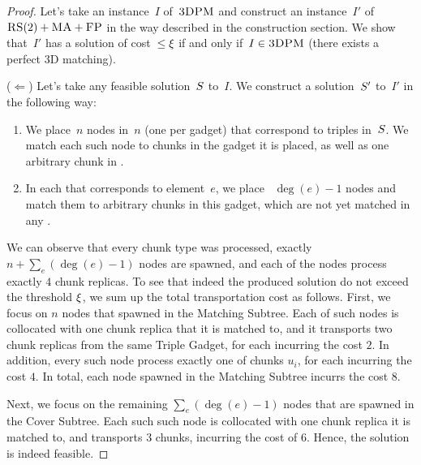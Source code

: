 \begin{proof}
  
  Let's take an instance~$I$ of~$\textsc{3DPM}$ and construct an instance~$I'$ of~$\textsc{RS}(2)+\textsc{MA}+\textsc{FP}$ in the way described in the construction section.
  We show that~$I'$ has a solution of cost~$\leq \xi$ if and only if~$I \in \textsc{3DPM}$ (there exists a perfect 3D matching).

  ($\Leftarrow$) Let's take any feasible solution~$S$ to~$I$.
  We construct a solution~$S'$ to~$I'$ in the following way:
  \begin{enumerate}
    \item We place~$n$ nodes in~$n$ {\TripleGadgets} (one per gadget)
    that correspond to triples in~$S$. We match each such node
    to chunks in the gadget it is placed, as well as one arbitrary
    chunk in {\UnqSubtree}.
    \item In each {\ElGadget} that corresponds to element~$e$, we place
   ~$\deg(e) - 1$ nodes and match them to arbitrary chunks in this
    gadget, which are not yet matched in any {\TripleGadget}.
  \end{enumerate}

  We can observe that every chunk type was processed, exactly $n + \sum_e(\deg(e) - 1)$ nodes are spawned, and each of the nodes process exactly $4$ chunk replicas.
  To see that indeed the produced solution do not exceed the threshold $\xi$,
  we sum up the total transportation cost as follows.
  First, we focus on $n$ nodes that spawned in the Matching Subtree.
  Each of such nodes is collocated with one chunk replica that it is matched to,
  and it transports two chunk replicas from the same Triple Gadget, for each incurring the cost $2$.
  In addition, every such node process exactly one of chunks $u_i$, for each incurring the cost $4$.
  In total, each node spawned in the Matching Subtree incurrs the cost $8$.

  Next, we focus on the remaining $\sum_e(\deg(e)-1)$ nodes that are spawned in the Cover Subtree.
  Each such such node is collocated with one chunk replica it is matched to, and transports $3$ chunks, incurring the cost of $6$.
  Hence, the solution is indeed feasible.


\end{proof}
